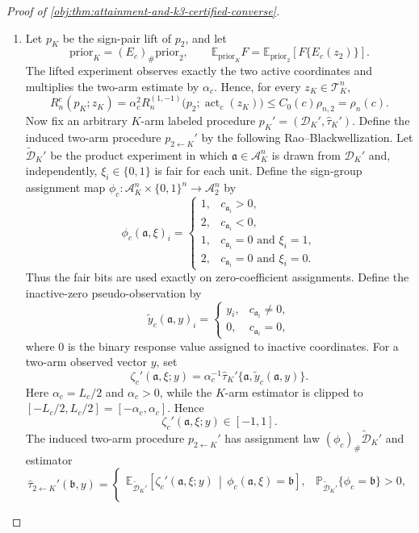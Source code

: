 \documentclass[11pt]{article}
\begin{document}
\begin{proof}[Proof of \cref{obj:thm:attainment-and-k3-certified-converse}]
\begin{enumerate}
\item Let \(p_K\) be the sign-pair lift of \(p_2\), and let
\[
\mathrm{prior}_K=(E_c)_\#\mathrm{prior}_2,
\qquad
\mathbb E_{\mathrm{prior}_K}F
=
\mathbb E_{\mathrm{prior}_2}\!\left[F\{E_c(z_2)\}\right].
\]
The lifted experiment observes exactly the two active coordinates and multiplies the two-arm estimate by \(\alpha_c\). Hence, for every \(z_K\in\mathcal T_K^n\),
\[
R_n^c(p_K;z_K)
=
\alpha_c^2
R_n^{(1,-1)}
\bigl(p_2;\operatorname{act}_c(z_K)\bigr)
\le
C_0(c)\rho_{n,2}
=
\rho_n(c).
\]
Now fix an arbitrary \(K\)-arm labeled procedure \(p_K'=(\mathcal D_K',\widehat\tau_K')\). Define the induced two-arm procedure \(p_{2\leftarrow K}'\) by the following Rao--Blackwellization. Let \(\widetilde{\mathcal D}_K'\) be the product experiment in which \(\mathfrak a\in\mathcal A_K^n\) is drawn from \(\mathcal D_K'\) and, independently, \(\xi_i\in\{0,1\}\) is fair for each unit. Define the sign-group assignment map \(\phi_c:\mathcal A_K^n\times\{0,1\}^n\to\mathcal A_2^n\) by
\[
\phi_c(\mathfrak a,\xi)_i
=
\begin{cases}
1, & c_{\mathfrak a_i}>0,\\
2, & c_{\mathfrak a_i}<0,\\
1, & c_{\mathfrak a_i}=0\text{ and }\xi_i=1,\\
2, & c_{\mathfrak a_i}=0\text{ and }\xi_i=0.
\end{cases}
\]
Thus the fair bits are used exactly on zero-coefficient assignments. Define the inactive-zero pseudo-observation by
\[
\widetilde y_c(\mathfrak a,y)_i
=
\begin{cases}
y_i, & c_{\mathfrak a_i}\ne 0,\\
0, & c_{\mathfrak a_i}=0,
\end{cases}
\]
where \(0\) is the binary response value assigned to inactive coordinates. For a two-arm observed vector \(y\), set
\[
\zeta_c'(\mathfrak a,\xi;y)
=
\alpha_c^{-1}\widehat\tau_K'\{\mathfrak a,\widetilde y_c(\mathfrak a,y)\}.
\]
Here \(\alpha_c=L_c/2\) and \(\alpha_c>0\), while the \(K\)-arm estimator is clipped to \([-L_c/2,L_c/2]=[-\alpha_c,\alpha_c]\). Hence
\[
\zeta_c'(\mathfrak a,\xi;y)\in[-1,1].
\]
The induced two-arm procedure \(p_{2\leftarrow K}'\) has assignment law \((\phi_c)_\#\widetilde{\mathcal D}_K'\) and estimator
\[
\widehat\tau_{2\leftarrow K}'(\mathfrak b,y)
=
\begin{cases}
\mathbb E_{\widetilde{\mathcal D}_K'}\!\left[
\zeta_c'(\mathfrak a,\xi;y)
\,\middle|\,\phi_c(\mathfrak a,\xi)=\mathfrak b
\right],
&\mathbb P_{\widetilde{\mathcal D}_K'}\{\phi_c=\mathfrak b\}>0,\\[0.5ex]

\end{cases}\]
\end{enumerate}
\end{proof}
\end{document}

